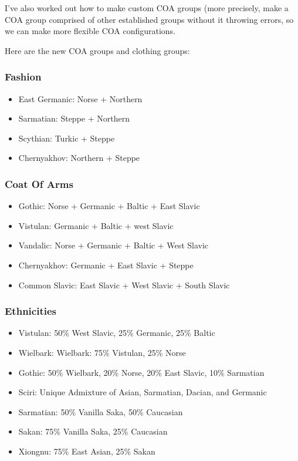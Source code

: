 \documentclass{article}
\begin{document}
	I’ve also worked out how to make custom COA groups (more precisely, make a COA group comprised of other established groups without it throwing errors, so we can make more flexible COA configurations.
	
	Here are the new COA groups and clothing groups:
	
	\subsubsection{Fashion}
	\begin{itemize}
		\item East Germanic: Norse + Northern
		\item Sarmatian: Steppe + Northern
		\item Scythian: Turkic + Steppe
		\item Chernyakhov: Northern + Steppe
	\end{itemize}
	
	\subsubsection{Coat Of Arms}
	\begin{itemize}
		\item Gothic: Norse + Germanic + Baltic + East Slavic
		\item Vistulan: Germanic + Baltic + west Slavic
		\item Vandalic: Norse + Germanic + Baltic + West Slavic
		\item Chernyakhov: Germanic + East Slavic + Steppe
		\item Common Slavic: East Slavic + West Slavic + South Slavic
	\end{itemize}
	
	\subsubsection{Ethnicities}
	\begin{itemize}
		\item Vistulan: 50\% West Slavic, 25\% Germanic, 25\% Baltic
		\item Wielbark: Wielbark: 75\% Vistulan, 25\% Norse
		\item Gothic: 50\% Wielbark, 20\% Norse, 20\% East Slavic, 10\% Sarmatian
		\item Sciri: Unique Admixture of Asian, Sarmatian, Dacian, and Germanic
		\item Sarmatian: 50\% Vanilla Saka, 50\% Caucasian
		\item Sakan: 75\% Vanilla Saka, 25\% Caucasian
		\item Xiongnu: 75\% East Asian, 25\% Sakan
	\end{itemize}
	
\end{document}

